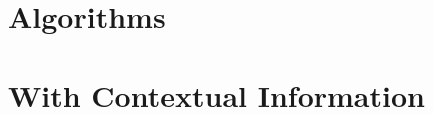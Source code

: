 \documentclass[10pt]{article}
\begin{document}
%
%
%

\vspace{-5pt}
\section{Algorithms}
\label{sec:Algo}


\section{With Contextual Information}



%

%
%




%
\end{document}
